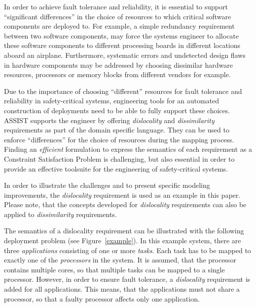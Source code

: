 \documentclass[english,biblatex]{lni}
\begin{document}
In order to achieve fault tolerance and reliability, it is essential to support ``significant differences'' in the choice of resources to which critical software components are deployed to.
For example, a simple redundancy requirement between two software components, may force the systems engineer to allocate these software components to different processing boards in different locations aboard an airplane.
Furthermore, systematic errors and undetected design flaws in hardware components may be addressed by choosing dissimilar hardware resources, processors or memory blocks from different vendors for example.

Due to the importance of choosing  ``different'' resources for fault tolerance and reliability in safety-critical systems, engineering tools for an automated construction of deployments need to be able to fully support these choices.
ASSIST supports the engineer by offering \emph{dislocality} and \emph{dissimilarity} requirements as part of the domain specific language.
They can be used to enforce ``differences'' for the choice of resources during the mapping process.
Finding an \emph{efficient} formulation to express the semantics of each requirement as a Constraint Satisfaction Problem is challenging, but also essential in order to provide an effective toolsuite for the engineering of safety-critical systems.

In order to illustrate the challenges and to present specific modeling improvements, the \emph{dislocality} requirement is used as an example in this paper.
Please note, that the concepts developed for \emph{dislocality} requirements can also be applied to \emph{dissimilarity} requirements.

The semantics of a dislocality requirement can be illustrated with the following deployment problem (see Figure~\ref{example}).
In this example system, there are three \emph{applications} consisting of one or more \emph{tasks}.
Each task has to be mapped to exactly one of the \emph{processors} in the system.
It is assumed, that the processor contains multiple cores, so that multiple tasks can be mapped to a single processor.
However, in order to ensure fault tolerance, a \emph{dislocality} requirement is added for all applications.
This means, that the applications must not share a processor, so that a faulty processor affects only one application.
\end{document}
